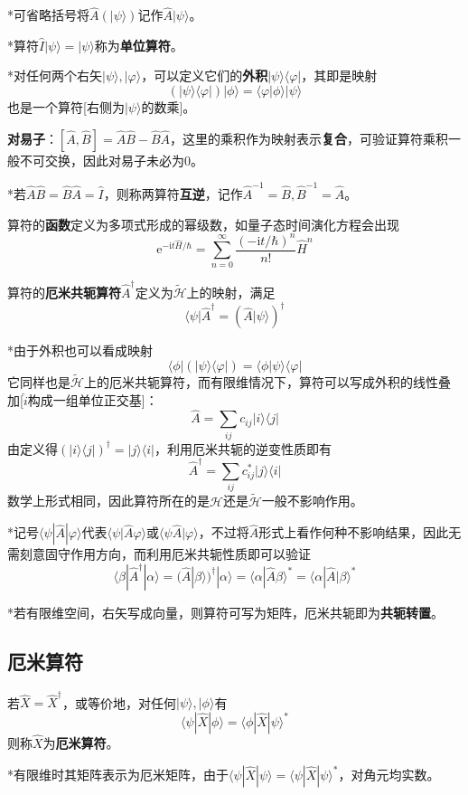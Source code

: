 \documentclass[a4paper,UTF8,fontset=windows]{ctexart}
\newcommand*{\ir}{\mathrm{i}}
\newcommand*{\er}{\mathrm{e}}
\newcommand*{\ket}[1]{|#1\rangle}
\newcommand*{\bra}[1]{\langle#1|}
\newcommand*{\bk}[2]{\langle#1|#2\rangle}
\newcommand*{\blk}[3]{\langle#1|#2|#3\rangle}
\begin{document}
*可省略括号将$\hat{A}(\ket{\psi})$记作$\hat{A}\ket{\psi}$。

*算符$\hat{I}\ket{\psi}=\ket{\psi}$称为\textbf{单位算符}。

*对任何两个右矢$\ket{\psi},\ket{\varphi}$，可以定义它们的\textbf{外积}$\ket{\psi}\bra{\varphi}$，其即是映射
$$(\ket{\psi}\bra{\varphi})\ket{\phi}=\bk{\varphi}{\phi}\ket{\psi}$$
也是一个算符[右侧为$\ket{\psi}$的数乘]。

\textbf{对易子}：$[\hat{A},\hat{B}]=\hat{A}\hat{B}-\hat{B}\hat{A}$，这里的乘积作为映射表示\textbf{复合}，可验证算符乘积一般不可交换，因此对易子未必为0。

*若$\hat{A}\hat{B}=\hat{B}\hat{A}=\hat{I}$，则称两算符\textbf{互逆}，记作$\hat{A}^{-1}=\hat{B},\hat{B}^{-1}=\hat{A}$。

算符的\textbf{函数}定义为多项式形成的幂级数，如量子态时间演化方程会出现
$$\er^{-\ir t\hat{H}/\hbar}=\sum_{n=0}^\infty\frac{(-\ir t/\hbar)^n}{n!}\hat{H}^n$$

算符的\textbf{厄米共轭算符}$\hat{A}^\dagger$定义为$\tilde{\mathcal{H}}$上的映射，满足
$$\bra{\psi}\hat{A}^\dagger=(\hat{A}\ket{\psi})^\dagger$$

*由于外积也可以看成映射
$$\bra{\phi}(\ket{\psi}\bra{\varphi})=\bk{\phi}{\psi}\bra{\varphi}$$
它同样也是$\tilde{\mathcal{H}}$上的厄米共轭算符，而有限维情况下，算符可以写成外积的线性叠加[$\hat{i}$构成一组单位正交基]：
$$\hat{A}=\sum_{ij}c_{ij}\ket{i}\bra{j}$$
由定义得$(\ket{i}\bra{j})^\dagger=\ket{j}\bra{i}$，利用厄米共轭的逆变性质即有
$$\hat{A}^\dagger=\sum_{ij}c_{ij}^*\ket{j}\bra{i}$$
数学上形式相同，因此算符所在的是$\mathcal{H}$还是$\tilde{\mathcal{H}}$一般不影响作用。

*记号$\blk{\psi}{\hat{A}}{\varphi}$代表$\bk{\psi}{\hat{A}\varphi}$或$\bk{\psi\hat{A}}{\varphi}$，不过将$\hat{A}$形式上看作何种不影响结果，因此无需刻意固守作用方向，而利用厄米共轭性质即可以验证
$$\blk{\beta}{\hat{A}^\dagger}{\alpha}=(\hat{A}\ket{\beta})^\dagger\ket{\alpha}=\bk{\alpha}{\hat{A}\beta}^*=\blk{\alpha}{\hat{A}}{\beta}^*$$

*若有限维空间，右矢写成向量，则算符可写为矩阵，厄米共轭即为\textbf{共轭转置}。

\subsection{厄米算符}
若$\hat{X}=\hat{X}^\dagger$，或等价地，对任何$\ket{\psi},\ket{\phi}$有
$$\blk{\psi}{\hat{X}}{\phi}=\blk{\phi}{\hat{X}}{\psi}^*$$
则称$\hat{X}$为\textbf{厄米算符}。

*有限维时其矩阵表示为厄米矩阵，由于$\blk{\psi}{\hat{X}}{\psi}=\blk{\psi}{\hat{X}}{\psi}^*$，对角元均实数。
\end{document}
